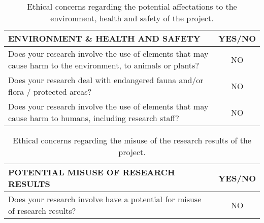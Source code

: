 \begin{table}[H]
	\centering
	\begin{tabular}[H]{ p{12.6cm} c }
		
		\toprule[2pt]
		
		\textbf{ENVIRONMENT \& HEALTH AND SAFETY} & \textbf{YES/NO} \\
		
		\midrule[1.5pt]
		
		Does your research involve the use of elements that may cause harm to the environment, to animals or plants?\vspace{0.2cm} & NO\\
		
		Does your research deal with endangered fauna and/or flora / protected areas?\vspace{0.2cm} & NO \\
		
		Does your research involve the use of elements that may cause harm to humans, including research staff?\vspace{0.2cm} & NO \\
		
		\bottomrule[2pt]
			
	\end{tabular}
	\caption[Ethics - Environment, health and safety]{Ethical concerns regarding the potential affectations to the environment, health and safety of the project.}
	\label{Ethics_Environment}
\end{table}



\begin{table}[H]
	\centering
	\begin{tabular}[H]{ p{12.6cm} c }
		
		\toprule[2pt]
		
		\textbf{POTENTIAL MISUSE OF RESEARCH RESULTS} & \textbf{YES/NO} \\
		
		\midrule[1.5pt]
		
		Does your research involve have a potential for misuse of research results?\vspace{0.2cm} & NO \\
		
		\bottomrule[2pt]
		
	\end{tabular}
	\caption[Ethics - Misuse of results]{Ethical concerns regarding the misuse of the research results of the project.}
	\label{Ethics_Misuse}
\end{table}


